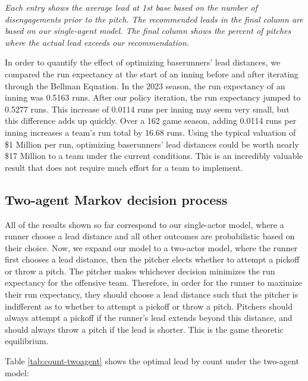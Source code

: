 \documentclass{article}
\begin{document}
      \begin{table}
        \centering
        
        \caption{
          \it Each entry shows the average lead at 1st base based on the number of disengagements prior to the pitch. The recommended leads in the final column are based on our single-agent model. The final column shows the percent of pitches where the actual lead exceeds our recommendation.
        }
        \label{tab:actual-vs-rec}
      \end{table}

      In order to quantify the effect of optimizing baserunners' lead distances, we compared the run expectancy at the start of an inning before and after iterating through the Bellman Equation. In the 2023 season, the run expectancy of an inning was 0.5163 runs. After our policy iteration, the run expectancy jumped to 0.5277 runs. This increase of 0.0114 runs per inning may seem very small, but this difference adds up quickly. Over a 162 game season, adding 0.0114 runs per inning increases a team's run total by 16.68 runs. Using the typical valuation of \$1 Million per run, optimizing baserunners' lead distances could be worth nearly \$17 Million to a team under the current conditions. This is an incredibly valuable result that does not require much effort for a team to implement.

    \subsection{Two-agent Markov decision process}

      All of the results shown so far correspond to our single-actor model, where a runner choose a lead distance and all other outcomes are probabilistic based on their choice. Now, we expand our model to a two-actor model, where the runner first chooses a lead distance, then the pitcher elects whether to attempt a pickoff or throw a pitch. The pitcher makes whichever decision minimizes the run expectancy for the offensive team. Therefore, in order for the runner to maximize their run expectancy, they should choose a lead distance such that the pitcher is indifferent as to whether to attempt a pickoff or throw a pitch. Pitchers should always attempt a pickoff if the runner's lead extends beyond this distance, and should always throw a pitch if the lead is shorter. This is the game theoretic equilibrium.

      Table \ref{tab:count-twoagent} shows the optimal lead by count under the two-agent model:
\end{document}

